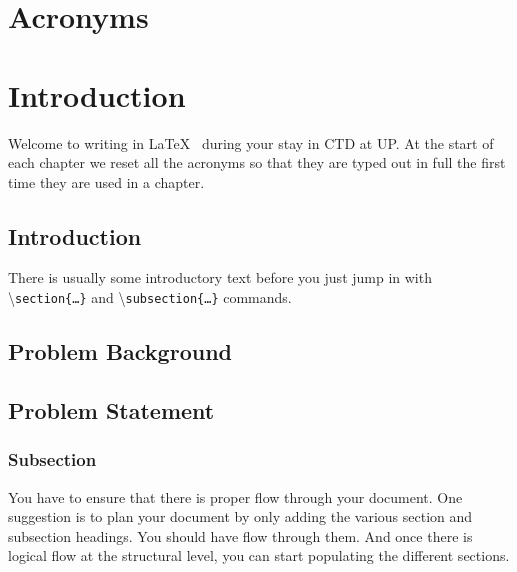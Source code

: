 \documentclass[a4paper,11pt,fleqn]{report}
\begin{document}


\tableofcontents
\listoffigures{}
\listoftables{}

\chapter*{Acronyms}
\begin{acronym}[ABCDEF]
\end{acronym}

\chapter{Introduction}
\setcounter{page}{1}
\acresetall
Welcome to writing in \LaTeX~ during your stay in \ac{CTD} at \ac{UP}.
At the start of each chapter we reset all the acronyms so that they are typed out in full the first time they are used in a chapter. 

\section{Introduction}
There is usually some introductory text before you just jump in with \textbackslash\texttt{section\{\ldots\}} and \textbackslash\texttt{subsection\{\ldots\}} commands.
\section{Problem Background} \label{sec: Problem Background}

\section{Problem Statement} \label{sec: Problem Statement}

\subsection{Subsection}
You have to ensure that there is proper flow through your document. 
One suggestion is to plan your document by only adding the various section and subsection headings. 
You should have flow through them. 
And once there is logical flow at the structural level, you can start populating the different sections.
\end{document}
